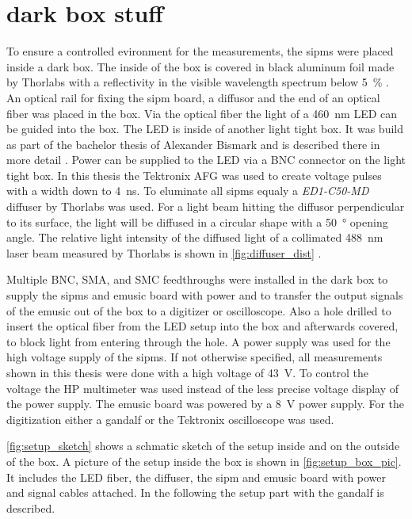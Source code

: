 \section{dark box stuff}
To ensure a controlled evironment for the measurements, the \acp{sipm} were placed inside a dark box.
The inside of the box is covered in black aluminum foil made by Thorlabs with a reflectivity in the visible wavelength spectrum below \SI{5}{\percent} \cite{}.
An optical rail for fixing the \ac{sipm} board, a diffusor and the end of an optical fiber was placed in the box.
Via the optical fiber the light of a \SI{460}{\nano\meter} LED can be guided into the box.
The LED is inside of another light tight box.
It was build as part of the bachelor thesis of Alexander Bismark and is described there in more detail \cite{}.
Power can be supplied to the LED via a BNC connector on the light tight box.
In this thesis the Tektronix AFG was used to create voltage pulses with a width down to \SI{4}{\nano\second}.
To eluminate all \acp{sipm} equaly a \textit{ED1-C50-MD} diffuser by Thorlabs was used.
For a light beam hitting the diffusor perpendicular to its surface, the light will be diffused in a circular shape with a \SI{50}{\degree} opening angle.
The relative light intensity of the diffused light of a collimated \SI{488}{\nano\meter} laser beam measured by Thorlabs is shown in \autoref{fig:diffuser_dist} \cite{}.

Multiple BNC, SMA, and SMC feedthroughs were installed in the dark box to supply the \acp{sipm} and \ac{emusic} board with power and to transfer the output signals of the \ac{emusic} out of the box to a digitizer or oscilloscope.
Also a hole drilled to insert the optical fiber from the LED setup into the box and afterwards covered, to block light from entering through the hole.
A power supply was used for the high voltage supply of the \acp{sipm}.
If not otherwise specified, all measurements shown in this thesis were done with a high voltage of \SI{43}{\volt}.
To control the voltage the HP multimeter was used instead of the less precise voltage display of the power supply.
The \ac{emusic} board was powered by a \SI{8}{\volt} power supply.
For the digitization either a \ac{gandalf} or the Tektronix oscilloscope was used.

\autoref{fig:setup_sketch} shows a schmatic sketch of the setup inside and on the outside of the box.
A picture of the setup inside the box is shown in \autoref{fig:setup_box_pic}.
It includes the LED fiber, the diffuser, the \ac{sipm} and \ac{emusic} board with power and signal cables attached.
In the following the setup part with the \ac{gandalf} is described.

